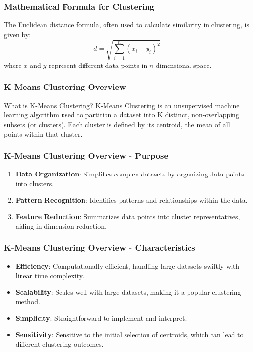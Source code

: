 \documentclass[aspectratio=169]{beamer}
\begin{document}
\begin{frame}[fragile]
    \frametitle{Mathematical Formula for Clustering}
    The Euclidean distance formula, often used to calculate similarity in clustering, is given by:
    \begin{equation}
    d = \sqrt{\sum_{i=1}^{n}(x_i - y_i)^2}
    \end{equation}
    where \(x\) and \(y\) represent different data points in \(n\)-dimensional space.
\end{frame}

\begin{frame}[fragile]
    \frametitle{K-Means Clustering Overview}
    \begin{block}{What is K-Means Clustering?}
        K-Means Clustering is an unsupervised machine learning algorithm used to partition a dataset into K distinct, non-overlapping subsets (or clusters). Each cluster is defined by its centroid, the mean of all points within that cluster.
    \end{block}
\end{frame}

\begin{frame}[fragile]
    \frametitle{K-Means Clustering Overview - Purpose}
    \begin{enumerate}
        \item \textbf{Data Organization}: Simplifies complex datasets by organizing data points into clusters.
        \item \textbf{Pattern Recognition}: Identifies patterns and relationships within the data.
        \item \textbf{Feature Reduction}: Summarizes data points into cluster representatives, aiding in dimension reduction.
    \end{enumerate}
\end{frame}

\begin{frame}[fragile]
    \frametitle{K-Means Clustering Overview - Characteristics}
    \begin{itemize}
        \item \textbf{Efficiency}: Computationally efficient, handling large datasets swiftly with linear time complexity.
        \item \textbf{Scalability}: Scales well with large datasets, making it a popular clustering method.
        \item \textbf{Simplicity}: Straightforward to implement and interpret.
        \item \textbf{Sensitivity}: Sensitive to the initial selection of centroids, which can lead to different clustering outcomes.
    \end{itemize}
\end{frame}
\end{document}
